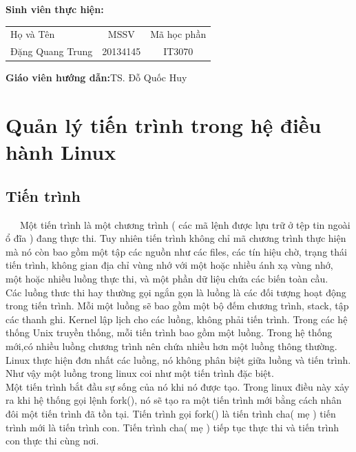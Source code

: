 \documentclass[a4paper,10pt]{report}
\begin{document}
\hspace{1cm}\fontsize{14}{16}\selectfont \textbf{Sinh viên thực hiện: }
\begin{longtable}{l c c }
Họ và Tên & MSSV &    Mã học phần \\[0.5cm]
Đặng Quang Trung &    20134145 & IT3070\\

\end{longtable}
\hspace{0.3cm}\fontsize{14}{16}\selectfont \textbf{Giáo viên hướng dẫn:}TS. Đỗ Quốc Huy \\[1.0cm]
\begin{center}
\end{center} 
\tableofcontents
\listoffigures
\listoftables
\chapter{Quản lý tiến trình trong hệ điều hành Linux}
\section{Tiến trình}
\ \ \ Một tiến trình là một chương trình ( các mã lệnh được lựu trữ ở tệp tin ngoài ổ đĩa ) đang thực thi. Tuy nhiên tiến trình không chỉ mã chương trình thực hiện mà nó còn bao gồm một tập các nguồn như các files, các tín hiệu chờ, trạng thái tiến trình, không gian địa chỉ vùng nhớ với một hoặc nhiều ánh xạ vùng nhớ, một hoặc nhiều luồng thực thi, và một phần dữ liệu chứa các biến toàn cầu. \\

Các luồng thưc thi hay thường gọi ngắn gọn là luồng là các đối tượng hoạt động trong tiến trình. Mỗi một luồng sẽ bao gồm một bộ đếm chương trình, stack, tập các thanh ghi. Kernel lập lịch cho các luồng, không phải tiến trình. Trong các hệ thống Unix truyền thống, mỗi tiến trình bao gồm một luồng. Trong hệ thống mới,có nhiều luồng chương trình nên chứa nhiều hơn một luồng thông thường. Linux thực hiện đơn nhất các luồng, nó không phân biệt giữa luồng và tiến trình. Như vậy một luồng trong linux coi như một tiến trình đặc biệt. \\

Một tiến trình bắt đầu sự sống của nó khi nó được tạo. Trong linux điều này xảy ra khi hệ thống gọi lệnh fork(), nó sẽ tạo ra một tiến trình mới bằng cách nhân đôi một tiến trình đã tồn tại. Tiến trình gọi fork() là tiến trình cha( mẹ ) tiến trình mới là tiến trình con. Tiến trình cha( mẹ ) tiếp tục thực thi và tiến trình con thực thi cùng nơi. \\
	
\end{document}
